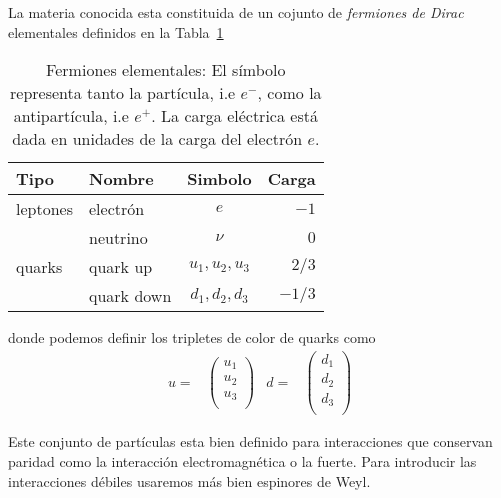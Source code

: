 \begin{frame}
La materia conocida esta constituida de un cojunto de \emph{fermiones de Dirac} elementales definidos en la Tabla~\ref{tab:ef}
\begin{table}
  \centering
  \begin{tabular}{l|l|c|r}
    Tipo &Nombre & Simbolo&Carga\\\hline{}
   leptones& electrón & $e$& $-1$\\
          & neutrino & $\nu$ & $0$\\\hline{}
   quarks &quark up  & $u_1,u_2,u_3$ & $2/3$\\
          &quark down  & $d_1,d_2,d_3$& $-1/3$\\
  \end{tabular}
  \caption{Fermiones elementales:
    El símbolo representa tanto la partícula, i.e  $e^-$, como la antipartícula, i.e $e^+$. La carga eléctrica está dada en unidades de la carga del electrón $e$.}
  \label{tab:ef}
\end{table}
donde podemos definir los tripletes de color de quarks como
\begin{align}
  u=&
  \begin{pmatrix}
    u_1 \\ u_2\\ u_3\\
  \end{pmatrix}
  &d=&
  \begin{pmatrix}
    d_1 \\ d_2 \\ d_3\\
  \end{pmatrix}
\end{align}

Este conjunto de partículas esta bien definido para interacciones que conservan paridad como la interacción electromagnética o la fuerte. Para introducir las interacciones débiles usaremos más bien espinores de Weyl.

\end{frame}

